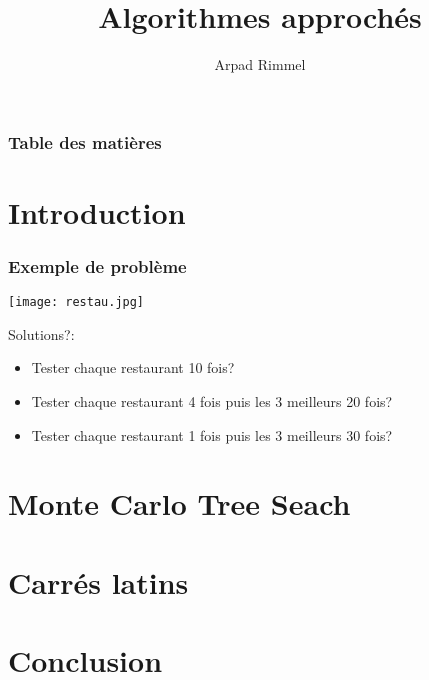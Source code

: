 \documentclass{beamer}
\begin{document}
\title{ Algorithmes approchés}

\author{Arpad Rimmel}



\begin{frame}
    \titlepage
\end{frame}

\begin{frame}
    \frametitle{Table des matières}
    \tableofcontents[]
\end{frame}


\section*{Introduction}


\begin{frame}
    \frametitle{Exemple de problème}
    \begin{center}
        \texttt{[image: restau.jpg]}
    \end{center}
    Solutions?:
    \begin{itemize}
        \item Tester chaque restaurant 10 fois?
        \item Tester chaque restaurant 4 fois puis les 3 meilleurs 20 fois?
        \item Tester chaque restaurant 1 fois puis les 3 meilleurs 30 fois?
    \end{itemize}
\end{frame}


\section{Monte Carlo Tree Seach}



\section{Carrés latins}




\section*{Conclusion}
\end{document}
